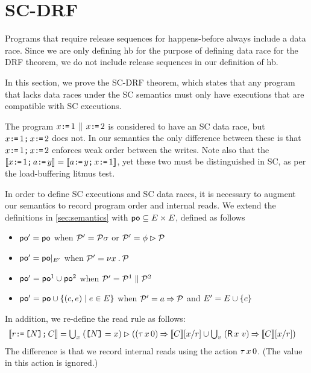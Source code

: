 \section{SC-DRF}


Programs that require release sequences for happens-before always include a
data race.  Since we are only defining hb for the purpose of defining data
race for the DRF theorem, we do not include release sequences in our
definition of hb.

In this section, we prove the SC-DRF theorem, which states that any program
that lacks data races under the SC semantics must only have executions that
are compatible with SC executions.

The program $x\texttt{:}\mkern-1mu\texttt{=}\,1\,\mathbin{\|}\, x\texttt{:}\mkern-1mu\texttt{=}\,2$ is considered to have an SC data race, but
$x\texttt{:}\mkern-1mu\texttt{=}\,1\texttt{;}\, x\texttt{:}\mkern-1mu\texttt{=}\,2$ does not.  In our semantics the only difference
between these is that $x\texttt{:}\mkern-1mu\texttt{=}\,1\texttt{;}\, x\texttt{:}\mkern-1mu\texttt{=}\,2$ enforces weak order between the
writes.  Note also that the
$\llbracket x\texttt{:}\mkern-1mu\texttt{=}\,1\texttt{;}\, a\texttt{:}\mkern-1mu\texttt{=}\, y\rrbracket=\llbracket a\texttt{:}\mkern-1mu\texttt{=}\, y\texttt{;}\, x\texttt{:}\mkern-1mu\texttt{=}\,1\rrbracket$, yet these two must
be distinguished in SC, as per the load-buffering litmus test.

In order to define SC executions and SC data races, it is necessary to
augment our semantics to record program order and internal reads.  We extend the definitions in
\textsection\ref{sec:semantics} with
${\mathrel{\mathsf{po}}}\subseteq{E}\times{E}$, defined as follows
\begin{itemize}
\item
  ${\mathrel{\mathsf{po}}'} = {\mathrel{\mathsf{po}}}$
  when $\mathcal{P}'=\mathcal{P}\sigma$
  or $\mathcal{P}'=\phi\mathbin\rhd\mathcal{P}$
\item
  ${\mathrel{\mathsf{po}}'} = {\mathrel{\mathsf{po}}}\mathbin{|}_{E'}$
  when $\mathcal{P}'=\nu x\mathbin.\mathcal{P}$
\item
  ${\mathrel{\mathsf{po}}'} = {\mathrel{\mathsf{po}}}^1\cup{\ensuremath{\mathrel{\mathsf{po}}}}^2$
  when $\mathcal{P}'=\mathcal{P}^1\parallel\mathcal{P}^2$
\item
  ${\mathrel{\mathsf{po}}'} = {\mathrel{\mathsf{po}}}\cup\{(c,e)\mid e\in E\}$
  when $\mathcal{P}'=a\mathbin\Rightarrow\mathcal{P}$ and $E' = E \cup \{c\}$
\end{itemize}
In addition, we re-define the read rule as follows:
\begin{align*}
  \sem{\aReg\GETS\REF{\bExp}\SEMI \aCmd} & = \textstyle\bigcup_\aLoc\; (\REF{\bExp}=\aLoc) \guard ((\iDR{\aLoc}{0}) \prefix \sem{\aCmd}[\aLoc/\aReg] \cup \textstyle\bigcup_\aVal\; (\DR\aLoc\aVal) \prefix \sem{\aCmd}[\aLoc/\aReg]) 
\end{align*}
The difference is that we record internal reads using the action
$\iDR{\aLoc}{0}$.  (The value in this action is ignored.)

